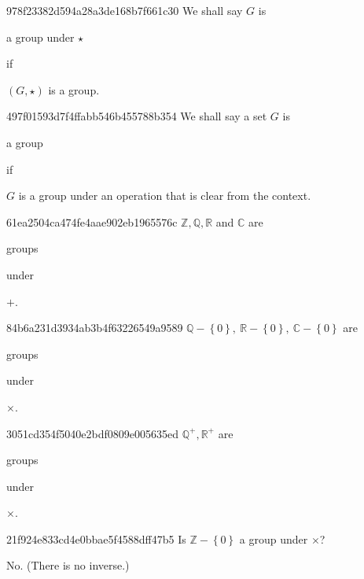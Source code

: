 \begin{note}{978f23382d594a28a3de168b7f661c30}
    We shall say \({ G }\) is \begin{icloze}{2}a group under \({ \star }\)\end{icloze} if \begin{icloze}{1}\({ (G, \star) }\) is a group.\end{icloze}
\end{note}

\begin{note}{497f01593d7f4ffabb546b455788b354}
    We shall say a set \({ G }\) is \begin{icloze}{2}a group\end{icloze} if \begin{icloze}{1}\({ G }\) is a group under an operation that is clear from the context.\end{icloze}
\end{note}

\begin{note}{61ea2504ca474fe4aae902eb1965576c}
    \({ \mathbb Z, \mathbb Q, \mathbb R }\) and \({ \mathbb C }\) are \begin{icloze}{2}groups\end{icloze} under \begin{icloze}{1}\({ + }\).\end{icloze}
\end{note}

\begin{note}{84b6a231d3934ab3b4f63226549a9589}
    \({ \mathbb Q - \left\{ 0 \right\},\: \mathbb R - \left\{ 0 \right\},\: \mathbb C - \left\{ 0 \right\} }\) are \begin{icloze}{2}groups\end{icloze} under \begin{icloze}{1}\({ \times }\).\end{icloze}
\end{note}

\begin{note}{3051cd354f5040e2bdf0809e005635ed}
    \({ \mathbb Q^{+}, \mathbb R^{+} }\) are \begin{icloze}{2}groups\end{icloze} under \begin{icloze}{1}\({ \times }\).\end{icloze}
\end{note}

\begin{note}{21f924e833cd4e0bbae5f4588dff47b5}
    Is \({ \mathbb Z - \left\{ 0 \right\} }\) a group under \({ \times }\)?

    \begin{cloze}{1}
        No. (There is no inverse.)
    \end{cloze}
\end{note}

